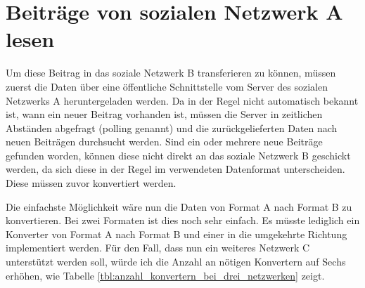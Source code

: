 \section{Beiträge von sozialen Netzwerk A lesen} %
\label{sec:beiträge_von_solzialen_netzwerk_a_lesen}


Um diese Beitrag in das soziale Netzwerk B transferieren zu können, müssen zuerst die Daten über eine öffentliche Schnittstelle vom Server des sozialen Netzwerks A heruntergeladen werden. Da in der Regel nicht automatisch bekannt ist, wann ein neuer Beitrag vorhanden ist, müssen die Server in zeitlichen Abständen abgefragt (polling genannt) und die zurückgelieferten Daten nach neuen Beiträgen durchsucht werden. Sind ein oder mehrere neue Beiträge gefunden worden, können diese nicht direkt an das soziale Netzwerk B geschickt werden, da sich diese in der Regel im verwendeten Datenformat unterscheiden. Diese müssen zuvor konvertiert werden.

\medskip

Die einfachste Möglichkeit wäre nun die Daten von Format A nach Format B zu konvertieren. Bei zwei Formaten ist dies noch sehr einfach. Es müsste lediglich ein Konverter von Format A nach Format B und einer in die umgekehrte Richtung implementiert werden. Für den Fall, dass nun ein weiteres Netzwerk C unterstützt werden soll, würde ich die Anzahl an nötigen Konvertern auf Sechs erhöhen, wie Tabelle \ref{tbl:anzahl_konvertern_bei_drei_netzwerken} zeigt. 

 \medskip


    

